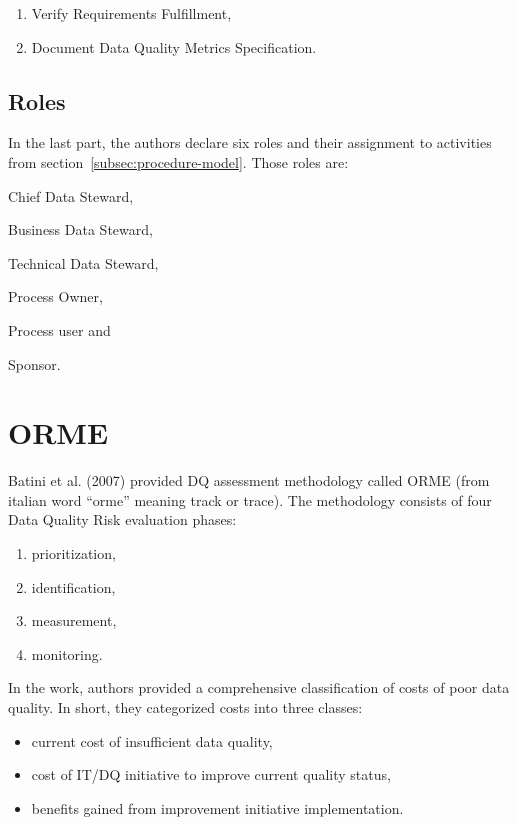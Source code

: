 \begin{enumerate}
    \item Verify Requirements Fulfillment,
    \item Document Data Quality Metrics Specification.
\end{enumerate}

\subsection{Roles}

In the last part, the authors declare six roles and their assignment to activities from section~\ref{subsec:procedure-model}.
Those roles are:
\begin{enumerate*}[label=(\roman*)]
    \item Chief Data Steward,
    \item Business Data Steward,
    \item Technical Data Steward,
    \item Process Owner,
    \item Process user and
    \item Sponsor.
\end{enumerate*}

\section{ORME}

Batini et al. (2007) provided DQ assessment methodology called ORME (from italian word \enquote{orme} meaning track or trace).
The methodology consists of four Data Quality Risk evaluation phases:

\begin{enumerate}
    \item prioritization,
    \item identification,
    \item measurement,
    \item monitoring.
\end{enumerate}

In the work, authors provided a comprehensive classification of costs of poor data quality.
In short, they categorized costs into three classes:

\begin{itemize}
    \item current cost of insufficient data quality,
    \item cost of IT/DQ initiative to improve current quality status,
    \item benefits gained from improvement initiative implementation.
\end{itemize}

